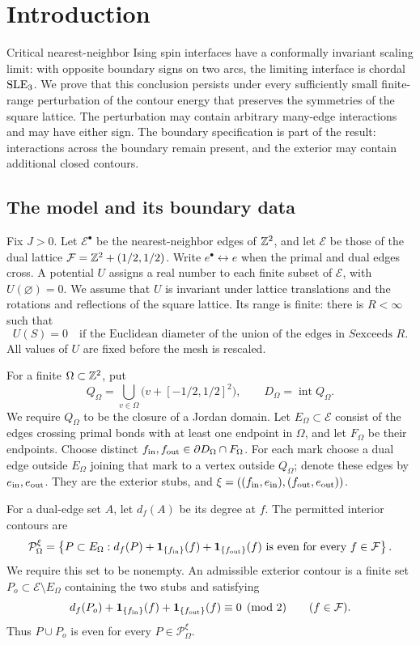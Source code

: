 \section{Introduction}\label{sec:introduction}

Critical nearest-neighbor Ising spin interfaces have a conformally invariant
scaling limit:
with opposite boundary signs on two arcs, the limiting interface is chordal
\(\operatorname{SLE}_3\). We prove that this conclusion persists under every sufficiently
small finite-range perturbation of the contour energy that preserves the
symmetries of the square lattice. The perturbation may contain arbitrary
many-edge interactions and may have either sign. The boundary specification
is part of the result: interactions across the boundary remain present, and
the exterior may contain additional closed contours.

\subsection{The model and its boundary data}

Fix \(J>0\). Let \(\mathcal E^\bullet\) be the nearest-neighbor edges of
\(\mathbb Z^2\), and let \(\mathcal E\) be those of the dual lattice
\(\mathcal F=\mathbb Z^2+(1/2,1/2)\). Write \(e^\bullet\leftrightarrow e\) when the
primal and dual edges cross. A potential \(U\) assigns a real number to
each finite subset of \(\mathcal E\), with \(U(\varnothing)=0\).
We assume that \(U\) is invariant under lattice translations and the
rotations and reflections of the square lattice. Its range is finite:
there is \(R<\infty\) such that
\[
 U(S)=0
 \quad\text{if the Euclidean diameter of the union of the edges in \(S\)
 exceeds \(R\).}
\]
All values of \(U\) are fixed before the mesh is rescaled.

For a finite \(\Omega\subset\mathbb Z^2\), put
\[
 Q_\Omega=\bigcup_{v\in\Omega}\bigl(v+[-1/2,1/2]^2\bigr),
 \qquad D_\Omega=\operatorname{int}Q_\Omega.
\]
We require \(Q_\Omega\) to be the closure of a Jordan domain.
Let \(E_\Omega\subset\mathcal E\) consist of the edges crossing primal
bonds with at least one endpoint in \(\Omega\), and let \(F_\Omega\)
be their endpoints. Choose distinct
\(f_{\rm in},f_{\rm out}\in\partial D_\Omega\cap F_\Omega\).
For each mark choose a dual edge outside \(E_\Omega\) joining that mark
to a vertex outside \(Q_\Omega\); denote these edges by
\(e_{\rm in},e_{\rm out}\). They are the exterior stubs, and
\(\xi=((f_{\rm in},e_{\rm in}),(f_{\rm out},e_{\rm out}))\).

For a dual-edge set \(A\), let \(d_f(A)\) be its degree at \(f\).
The permitted interior contours are
\[
 \mathcal P_\Omega^\xi
 =
 \left\{P\subset E_\Omega:
 d_f(P)+\mathbf 1_{\{f_{\rm in}\}}(f)+\mathbf 1_{\{f_{\rm out}\}}(f)
 \text{ is even for every }f\in\mathcal F\right\}.
\]
We require this set to be nonempty. An admissible exterior contour is a
finite set \(P_o\subset\mathcal E\setminus E_\Omega\) containing the two
stubs and satisfying
\[
 d_f(P_o)+\mathbf 1_{\{f_{\rm in}\}}(f)+\mathbf 1_{\{f_{\rm out}\}}(f)
 \equiv0\pmod2
 \qquad(f\in\mathcal F).
\]
Thus \(P\cup P_o\) is even for every \(P\in\mathcal P_\Omega^\xi\).

